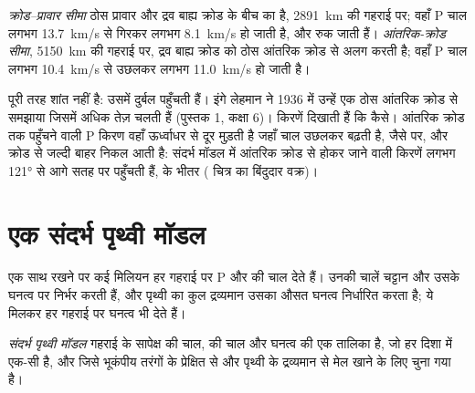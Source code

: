 \begin{definition}[क्रोड--प्रावार सीमा; आंतरिक-क्रोड सीमा]\label{def:g11:seismic-structure:core}
\emph{क्रोड--प्रावार सीमा} ठोस प्रावार और
द्रव बाह्य क्रोड के बीच का  है, \qty{2891}{km} की
गहराई पर; वहाँ P चाल लगभग \qty{13.7}{km/s} से गिरकर
लगभग \qty{8.1}{km/s} हो जाती है, और  रुक जाती हैं। \emph{आंतरिक-क्रोड
सीमा}, \qty{5150}{km} की गहराई पर,
द्रव बाह्य क्रोड को ठोस आंतरिक क्रोड से अलग करती है; वहाँ P चाल
लगभग \qty{10.4}{km/s} से उछलकर लगभग \qty{11.0}{km/s} हो जाती है।
\end{definition}

 पूरी तरह शांत नहीं है: उसमें दुर्बल  पहुँचती हैं। इंगे
लेहमान ने 1936 में उन्हें एक ठोस आंतरिक क्रोड से समझाया जिसमें 
अधिक तेज़ चलती हैं (पुस्तक 1, कक्षा 6)। किरणें दिखाती हैं कि कैसे। आंतरिक क्रोड तक पहुँचने वाली
P किरण वहाँ ऊर्ध्वाधर से दूर मुड़ती है जहाँ चाल उछलकर बढ़ती है, जैसे
 पर, और क्रोड से जल्दी बाहर निकल आती है: संदर्भ मॉडल में
आंतरिक क्रोड से होकर जाने वाली किरणें लगभग \ang{121} से आगे सतह पर पहुँचती हैं,  के भीतर ( चित्र का बिंदुदार वक्र)।

\section{एक संदर्भ पृथ्वी मॉडल}\label{sec:g11:seismic-structure:model}

एक साथ रखने पर कई मिलियन  हर गहराई पर P और  की चाल
देते हैं। उनकी चालें चट्टान और उसके घनत्व पर निर्भर करती हैं, और
पृथ्वी का कुल द्रव्यमान उसका औसत घनत्व निर्धारित करता है; ये मिलकर
हर गहराई पर घनत्व भी देते हैं।

\begin{definition}[संदर्भ पृथ्वी मॉडल]\label{def:g11:seismic-structure:reference-model}
\emph{संदर्भ पृथ्वी मॉडल} गहराई के सापेक्ष
 की चाल,  की चाल और घनत्व की एक तालिका है, जो
हर दिशा में एक-सी है, और जिसे भूकंपीय तरंगों के प्रेक्षित  से और
पृथ्वी के द्रव्यमान से मेल खाने के लिए चुना गया है।
\end{definition}

